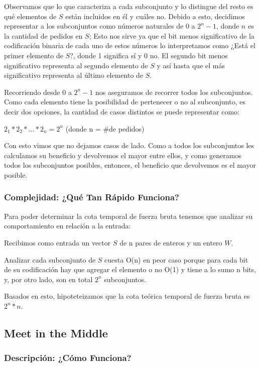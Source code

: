 \documentclass[a4paper]{article}
\begin{document}
Observamos que lo que caracteriza a cada subconjunto y lo distingue del resto es qué elementos de $S$ están incluidos en él y cuáles no. Debido a esto, decidimos representar a los subconjuntos como números naturales de $0$ a $2^n - 1$, donde $n$ es la cantidad de pedidos en $S$; Esto nos sirve ya que el bit menos significativo de la codificación binaria de cada uno de estos números lo interpretamos como ¿Está el primer elemento de $S$?, donde 1 significa sí y 0 no. El segundo bit menos significativo representa al segundo elemento de $S$ y así hasta que el más significativo representa al último elemento de $S$.

Recorriendo desde $0$ a $2^n - 1$ nos aseguramos de recorrer todos los subconjuntos. Como cada elemento tiene la posibilidad de pertenecer o no al subconjunto, es decir dos opciones, la cantidad de casos distintos se puede representar como:

\begin{center}
$ 2_1 * 2_2 * ... * 2_n = 2^n $ (donde n = \#de pedidos)
\end{center}

Con esto vimos que no dejamos casos de lado. Como a todos los subconjuntos les calculamos su beneficio y devolvemos el mayor entre ellos, y como generamos todos los subconjuntos posibles, entonces, el beneficio que devolvemos es el mayor posible.


\subsubsection{Complejidad: ¿Qué Tan Rápido Funciona?}

Para poder determinar la cota temporal de fuerza bruta tenemos que analizar su comportamiento en relación a la entrada:

Recibimos como entrada un vector $S$ de n pares de enteros y un entero $W$.

Analizar cada subconjunto de $S$ cuesta O(n) en peor caso porque para cada bit de su codificación hay que agregar el elemento o no O(1) y tiene a lo sumo n bits, y, por otro lado, son en total $2^n$ subconjuntos.

Basados en esto, hipoteteizamos que la cota teórica temporal de fuerza bruta es $2^n * n$.

\subsection{Meet in the Middle}

\subsubsection{Descripción: ¿Cómo Funciona?}
\end{document}
